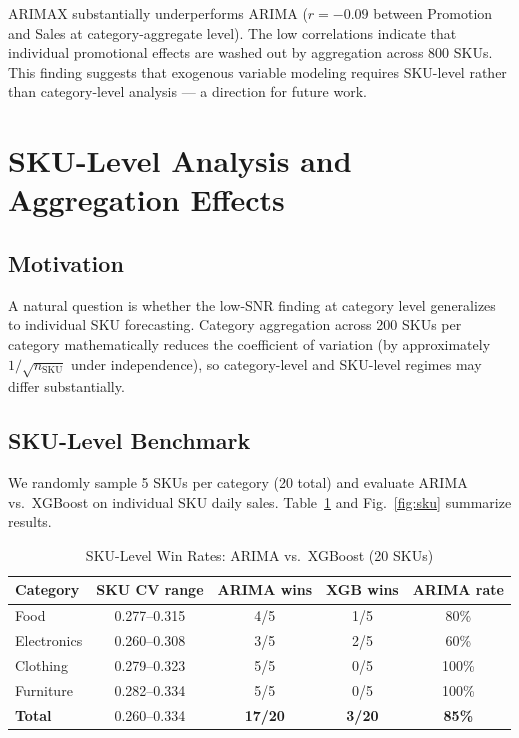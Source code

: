 \documentclass[journal]{IEEEtran}
\begin{document}
ARIMAX substantially underperforms ARIMA ($r=-0.09$ between Promotion and Sales at category-aggregate level). The low correlations indicate that individual promotional effects are washed out by aggregation across 800 SKUs. This finding suggests that exogenous variable modeling requires SKU-level rather than category-level analysis — a direction for future work.

\section{SKU-Level Analysis and Aggregation Effects}
\label{sec:sku}

\subsection{Motivation}

A natural question is whether the low-SNR finding at category level generalizes to individual SKU forecasting. Category aggregation across 200 SKUs per category mathematically reduces the coefficient of variation (by approximately $1/\sqrt{n_{\text{SKU}}}$ under independence), so category-level and SKU-level regimes may differ substantially.

\subsection{SKU-Level Benchmark}

We randomly sample 5 SKUs per category (20 total) and evaluate ARIMA vs.\ XGBoost on individual SKU daily sales. Table~\ref{tab:sku} and Fig.~\ref{fig:sku} summarize results.

\begin{table}[htbp]
\centering
\caption{SKU-Level Win Rates: ARIMA vs.\ XGBoost (20 SKUs)}
\label{tab:sku}
\begin{tabular}{lcccc}
\toprule
\textbf{Category} & \textbf{SKU CV range} & \textbf{ARIMA wins} & \textbf{XGB wins} & \textbf{ARIMA rate} \\
\midrule
Food        & 0.277–0.315 & 4/5 & 1/5 & 80\% \\
Electronics & 0.260–0.308 & 3/5 & 2/5 & 60\% \\
Clothing    & 0.279–0.323 & 5/5 & 0/5 & 100\% \\
Furniture   & 0.282–0.334 & 5/5 & 0/5 & 100\% \\
\midrule
\textbf{Total} & 0.260–0.334 & \textbf{17/20} & \textbf{3/20} & \textbf{85\%} \\
\bottomrule
\end{tabular}
\end{table}
\end{document}
